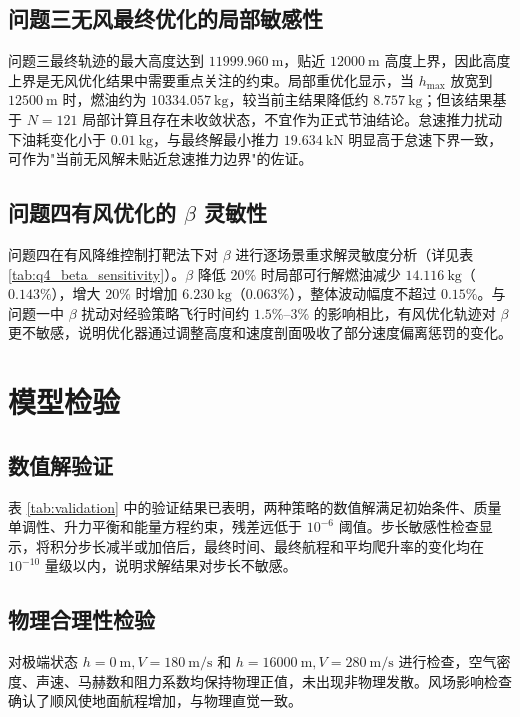 \documentclass[withoutpreface,bwprint]{cumcmthesis}
\begin{document}
\subsection{问题三无风最终优化的局部敏感性}

问题三最终轨迹的最大高度达到 $11999.960\ \mathrm{m}$，贴近 $12000\ \mathrm{m}$ 高度上界，因此高度上界是无风优化结果中需要重点关注的约束。局部重优化显示，当 $h_{\max}$ 放宽到 $12500\ \mathrm{m}$ 时，燃油约为 $10334.057\ \mathrm{kg}$，较当前主结果降低约 $8.757\ \mathrm{kg}$；但该结果基于 $N=121$ 局部计算且存在未收敛状态，不宜作为正式节油结论。怠速推力扰动下油耗变化小于 $0.01\ \mathrm{kg}$，与最终解最小推力 $19.634\ \mathrm{kN}$ 明显高于怠速下界一致，可作为"当前无风解未贴近怠速推力边界"的佐证。

\subsection{\texorpdfstring{问题四有风优化的 $\beta$ 灵敏性}{问题四有风优化的 beta 灵敏性}}

问题四在有风降维控制打靶法下对 $\beta$ 进行逐场景重求解灵敏度分析（详见表 \ref{tab:q4_beta_sensitivity}）。$\beta$ 降低 $20\%$ 时局部可行解燃油减少 $14.116\ \mathrm{kg}$（$0.143\%$），增大 $20\%$ 时增加 $6.230\ \mathrm{kg}$（$0.063\%$），整体波动幅度不超过 $0.15\%$。与问题一中 $\beta$ 扰动对经验策略飞行时间约 $1.5\%$--$3\%$ 的影响相比，有风优化轨迹对 $\beta$ 更不敏感，说明优化器通过调整高度和速度剖面吸收了部分速度偏离惩罚的变化。

\section{模型检验}

\subsection{数值解验证}

表 \ref{tab:validation} 中的验证结果已表明，两种策略的数值解满足初始条件、质量单调性、升力平衡和能量方程约束，残差远低于 $10^{-6}$ 阈值。步长敏感性检查显示，将积分步长减半或加倍后，最终时间、最终航程和平均爬升率的变化均在 $10^{-10}$ 量级以内，说明求解结果对步长不敏感。

\subsection{物理合理性检验}

对极端状态 $h=0\ \mathrm{m}, V=180\ \mathrm{m/s}$ 和 $h=16000\ \mathrm{m}, V=280\ \mathrm{m/s}$ 进行检查，空气密度、声速、马赫数和阻力系数均保持物理正值，未出现非物理发散。风场影响检查确认了顺风使地面航程增加，与物理直觉一致。
\end{document}
